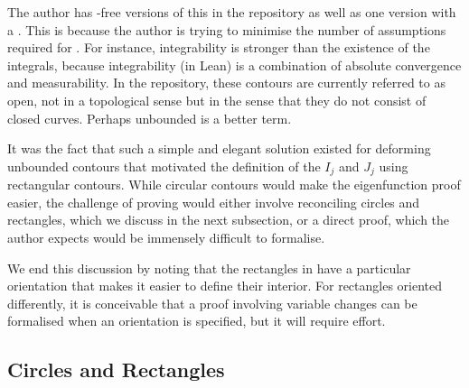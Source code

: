 The author has \sorry-free versions of this in the repository as well as one version with a \sorry. This is because the author is trying to minimise the number of assumptions required for . For instance, integrability is stronger than the existence of the integrals, because integrability (in Lean) is a combination of absolute convergence and measurability. In the repository, these contours are currently referred to as open, not in a topological sense but in the sense that they do not consist of closed curves. Perhaps unbounded is a better term.

It was the fact that such a simple and elegant solution existed for deforming unbounded contours that motivated the definition of the $I_j$ and $J_j$ using rectangular contours. While circular contours would make the eigenfunction proof easier, the challenge of proving  would either involve reconciling circles and rectangles, which we discuss in the next subsection, or a direct proof, which the author expects would be immensely difficult to formalise.

We end this discussion by noting that the rectangles in  have a particular orientation that makes it easier to define their interior. For rectangles oriented differently, it is conceivable that a proof involving variable changes can be formalised when an orientation is specified, but it will require effort.

\subsection{Circles and Rectangles}



